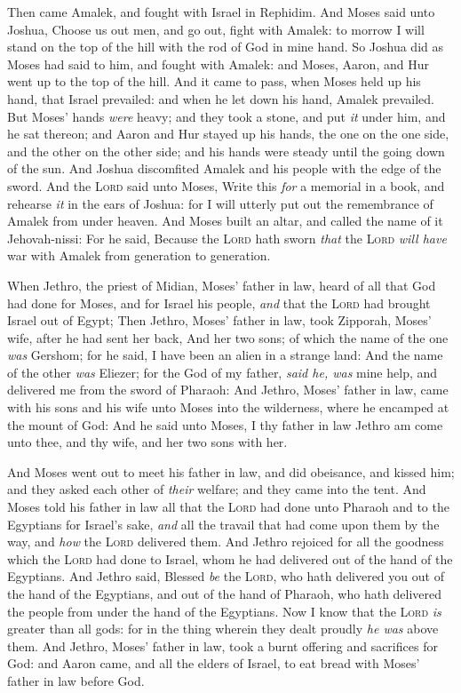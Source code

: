 \documentclass[11pt,letterpaper,oneside]{memoir}
\begin{document}
Then came Amalek, and fought with Israel in Rephidim. And Moses said
unto Joshua, Choose us out men, and go out, fight with Amalek: to morrow
I will stand on the top of the hill with the rod of God in mine hand. So
Joshua did as Moses had said to him, and fought with Amalek: and Moses,
Aaron, and Hur went up to the top of the hill. And it came to pass, when
Moses held up his hand, that Israel prevailed: and when he let down his
hand, Amalek prevailed. But Moses' hands \emph{were} heavy; and they
took a stone, and put \emph{it} under him, and he sat thereon; and Aaron
and Hur stayed up his hands, the one on the one side, and the other on
the other side; and his hands were steady until the going down of the
sun. And Joshua discomfited Amalek and his people with the edge of the
sword. And the \textsc{Lord} said unto Moses, Write this \emph{for} a
memorial in a book, and rehearse \emph{it} in the ears of Joshua: for I
will utterly put out the remembrance of Amalek from under heaven. And
Moses built an altar, and called the name of it Jehovah-nissi: For he
said, Because the \textsc{Lord} hath sworn \emph{that} the \textsc{Lord}
\emph{will have} war with Amalek from generation to generation.

When Jethro, the priest of Midian, Moses' father in law, heard of all
that God had done for Moses, and for Israel his people, \emph{and} that
the \textsc{Lord} had brought Israel out of Egypt; Then Jethro, Moses'
father in law, took Zipporah, Moses' wife, after he had sent her back,
And her two sons; of which the name of the one \emph{was} Gershom; for
he said, I have been an alien in a strange land: And the name of the
other \emph{was} Eliezer; for the God of my father, \emph{said he, was}
mine help, and delivered me from the sword of Pharaoh: And Jethro,
Moses' father in law, came with his sons and his wife unto Moses into
the wilderness, where he encamped at the mount of God: And he said unto
Moses, I thy father in law Jethro am come unto thee, and thy wife, and
her two sons with her.

And Moses went out to meet his father in law, and did obeisance, and
kissed him; and they asked each other of \emph{their} welfare; and they
came into the tent. And Moses told his father in law all that the
\textsc{Lord} had done unto Pharaoh and to the Egyptians for Israel's
sake, \emph{and} all the travail that had come upon them by the way, and
\emph{how} the \textsc{Lord} delivered them. And Jethro rejoiced for all
the goodness which the \textsc{Lord} had done to Israel, whom he had
delivered out of the hand of the Egyptians. And Jethro said, Blessed
\emph{be} the \textsc{Lord}, who hath delivered you out of the hand of
the Egyptians, and out of the hand of Pharaoh, who hath delivered the
people from under the hand of the Egyptians. Now I know that the
\textsc{Lord} \emph{is} greater than all gods: for in the thing wherein
they dealt proudly \emph{he was} above them. And Jethro, Moses' father
in law, took a burnt offering and sacrifices for God: and Aaron came,
and all the elders of Israel, to eat bread with Moses' father in law
before God.
\end{document}
